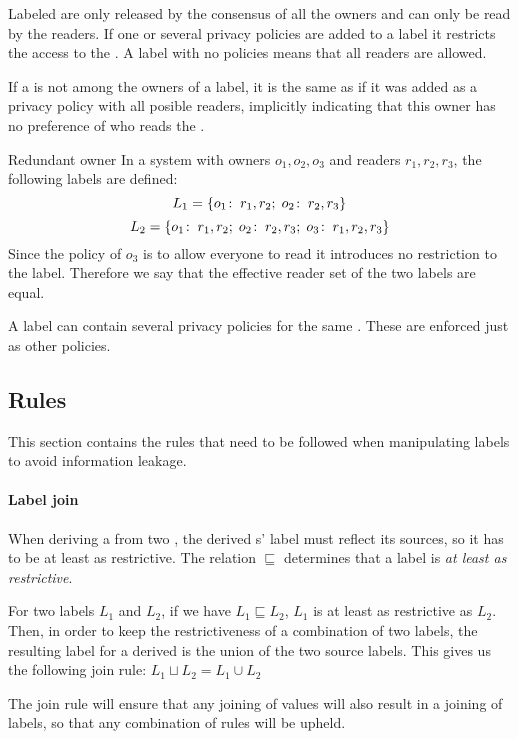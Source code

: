 Labeled \xvalues{} are only released by the consensus of all the owners and can only be read by the readers.
If one or several privacy policies are added to a label it restricts the access to the \xvalue{}.
A label with no policies  means that all readers are allowed.

If a \principal{} is not among the owners of a label, it is the same as if it was added as a privacy policy with all posible readers, implicitly indicating that this owner has no preference of who reads the \xvalue{}.

\begin{example}{Redundant owner}
In a system with owners $o_1, o_2, o_3$ and readers $r_1, r_2, r_3$, the following labels are defined:
$$L_1 = \{o_1\!:\;r_1,r_2;\; o_2\!:\;r_2, r_3\}$$
$$L_2 = \{o_1\!:\;r_1,r_2;\; o_2\!:\;r_2, r_3;\; o_3\!:\;r_1, r_2, r_3\}$$
Since the policy of $o_3$ is to allow everyone to read it introduces no restriction to the label.
Therefore we say that the effective reader set of the two labels are equal.
\end{example}

A label can contain several privacy policies for the same \principal{}.
These are enforced just as other policies.

\subsection{Rules}
This section contains the rules that need to be followed when manipulating labels to avoid information leakage.

\paragraph{Label join}
When deriving a \xvalue{} from two \xvalues{}, the derived \xvalue{}s' label must reflect its sources, so it has to be at least as restrictive.
The relation $\sqsubseteq$ determines that a label is \textit{at least as restrictive}.
\begin{definition}
  For two labels $L_1$ and $L_2$, if we have $L_1 \sqsubseteq L_2$, $L_1$ is at least as restrictive as $L_2$.
  Then, in order to keep the restrictiveness of a combination of two labels, the resulting label for a derived \xvalue{} is the union of the two source labels.
  This gives us the following join rule:
  $L_1 \sqcup L_2 = L_1 \cup L_2$
\end{definition}

The join rule will ensure that any joining of values will also result in a joining of labels, so that any combination of rules will be upheld.


